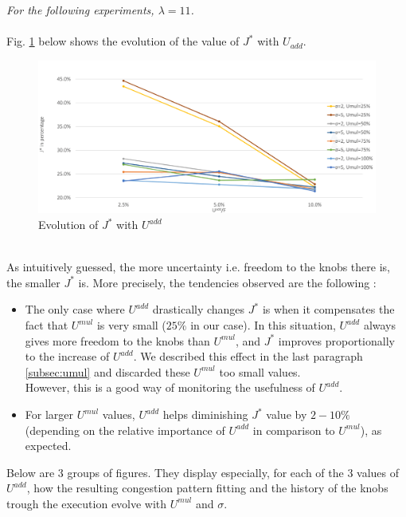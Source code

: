 \emph{For the following experiments, $\lambda=11$.}\\
\\
Fig. \ref{fig:uaddevolution} below shows the evolution of the value of $J^{*}$ with $U_{add}$.\\
\begin{figure}[h]
	\caption{Evolution of $J^{*}$ with $U^{add}$}
	\label{fig:uaddevolution}
	\includegraphics[width=7in]{figures/uadd.png}
\end{figure}
\\
As intuitively guessed, the more uncertainty i.e. freedom to the knobs there is, the smaller $J^{*}$ is.
More precisely, the tendencies observed are the following :\\
\begin{itemize}
	\item The only case where $U^{add}$ drastically changes $J^{*}$ is when it compensates the fact that $U^{mul}$ is very small ($25\% $ in our case). In this situation, $U^{add}$ always gives more freedom to the knobs than $U^{mul}$, and $J^{*}$ improves proportionally to the increase of $U^{add}$. We described this effect in the last paragraph \ref{subsec:umul} and discarded these $U^{mul}$ too small values.\\
However, this is a good way of monitoring the usefulness of $U^{add}$.
	\item For larger $U^{mul}$ values, $U^{add}$ helps diminishing $J^{*}$ value by $2-10 \% $ (depending on the relative importance of $U^{add}$ in comparison to $U^{mul}$), as expected.
\end{itemize}
Below are 3 groups of figures. They display especially, for each of the 3 values of $U^{add}$, how the resulting congestion pattern fitting and the history of the knobs trough the execution evolve with $U^{mul}$ and $\sigma$.
